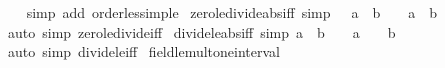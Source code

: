 \begin{isabellebody}
%
\isadelimproof
\ \ %
\endisadelimproof
%
\isatagproof
{}\isamarkupfalse%
\ {\isacharparenleft}{\kern0pt}simp\ add{\isacharcolon}{\kern0pt}\ order{\isacharunderscore}{\kern0pt}less{\isacharunderscore}{\kern0pt}imp{\isacharunderscore}{\kern0pt}le{\isacharparenright}{\kern0pt}%
\endisatagproof
{\isafoldproof}%
%
\isadelimproof
\isanewline
%
\endisadelimproof
\isanewline
{}\isamarkupfalse%
\ zero{\isacharunderscore}{\kern0pt}le{\isacharunderscore}{\kern0pt}divide{\isacharunderscore}{\kern0pt}abs{\isacharunderscore}{\kern0pt}iff\ {\isacharbrackleft}{\kern0pt}simp{\isacharbrackright}{\kern0pt}{\isacharcolon}{\kern0pt}\ {\isachardoublequoteopen}{\isacharparenleft}{\kern0pt}{}\ {\isasymle}\ a\ {\isacharslash}{\kern0pt}\ {\isasymbar}b{\isasymbar}{\isacharparenright}{\kern0pt}\ {\isacharequal}{\kern0pt}\ {\isacharparenleft}{\kern0pt}{}\ {\isasymle}\ a\ {\isasymor}\ b\ {\isacharequal}{\kern0pt}\ {}{\isacharparenright}{\kern0pt}{\isachardoublequoteclose}\isanewline
%
\isadelimproof
\ \ %
\endisadelimproof
%
\isatagproof
{}\isamarkupfalse%
\ {\isacharparenleft}{\kern0pt}auto\ simp{\isacharcolon}{\kern0pt}\ zero{\isacharunderscore}{\kern0pt}le{\isacharunderscore}{\kern0pt}divide{\isacharunderscore}{\kern0pt}iff{\isacharparenright}{\kern0pt}%
\endisatagproof
{\isafoldproof}%
%
\isadelimproof
\isanewline
%
\endisadelimproof
\isanewline
{}\isamarkupfalse%
\ divide{\isacharunderscore}{\kern0pt}le{\isacharunderscore}{\kern0pt}{}{\isacharunderscore}{\kern0pt}abs{\isacharunderscore}{\kern0pt}iff\ {\isacharbrackleft}{\kern0pt}simp{\isacharbrackright}{\kern0pt}{\isacharcolon}{\kern0pt}\ {\isachardoublequoteopen}{\isacharparenleft}{\kern0pt}a\ {\isacharslash}{\kern0pt}\ {\isasymbar}b{\isasymbar}\ {\isasymle}\ {}{\isacharparenright}{\kern0pt}\ {\isacharequal}{\kern0pt}\ {\isacharparenleft}{\kern0pt}a\ {\isasymle}\ {}\ {\isasymor}\ b\ {\isacharequal}{\kern0pt}\ {}{\isacharparenright}{\kern0pt}{\isachardoublequoteclose}\isanewline
%
\isadelimproof
\ \ %
\endisadelimproof
%
\isatagproof
{}\isamarkupfalse%
\ {\isacharparenleft}{\kern0pt}auto\ simp{\isacharcolon}{\kern0pt}\ divide{\isacharunderscore}{\kern0pt}le{\isacharunderscore}{\kern0pt}{}{\isacharunderscore}{\kern0pt}iff{\isacharparenright}{\kern0pt}%
\endisatagproof
{\isafoldproof}%
%
\isadelimproof
\isanewline
%
\endisadelimproof
\isanewline
{}\isamarkupfalse%
\ field{\isacharunderscore}{\kern0pt}le{\isacharunderscore}{\kern0pt}mult{\isacharunderscore}{\kern0pt}one{\isacharunderscore}{\kern0pt}interval{\isacharcolon}{\kern0pt}\isanewline

\end{isabellebody}
